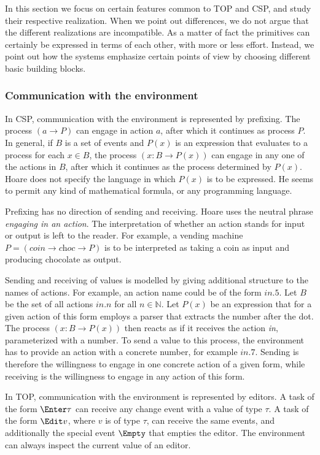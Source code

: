 In this section we focus on certain features common to TOP and CSP, and study their respective realization.
When we point out differences, we do not argue that the different realizations are incompatible.
As a matter of fact the primitives can certainly be expressed in terms of each other, with more or less effort.
Instead, we point out how the systems emphasize certain points of view by choosing different basic building blocks.


\subsubsection{Communication with the environment}

In CSP, communication with the environment is represented by prefixing.
The process $(a \to P)$ can engage in action $a$, after which it continues as process $P$.
In general, if $B$ is a set of events and $P(x)$ is an expression that evaluates to a process for each $x \in B$, the process $(x:B \to P(x))$ can engage in any one of the actions in $B$, after which it continues as the process determined by $P(x)$.
Hoare does not specify the language in which $P(x)$ is to be expressed.
He seems to permit any kind of mathematical formula, or any programming language.

Prefixing has no direction of sending and receiving.
Hoare uses the neutral phrase \emph{engaging in an action}.
The interpretation of whether an action stands for input or output is left to the reader.
For example, a vending machine $P = (\textit{coin} \to \textit{choc} \to P)$ is to be interpreted as taking a coin as input and producing chocolate as output.

Sending and receiving of values is modelled by giving additional structure to the names of actions.
For example, an action name could be of the form $\textit{in}.5$.
Let $B$ be the set of all actions $\textit{in}.n$ for all $n \in \mathbb{N}$.
Let $P(x)$ be an expression that for a given action of this form employs a parser that extracts the number after the dot.
The process $(x:B \to P(x))$ then reacts as if it receives the action \textit{in}, parameterized with a number.
To send a value to this process, the environment has to provide an action with a concrete number, for example $\textit{in}.7$.
Sending is therefore the willingness to engage in one concrete action of a given form, while receiving is the willingness to engage in any action of this form.

In TOP, communication with the environment is represented by editors.
A task of the form $\Enter \tau$ can receive any change event with a value of type $\tau$.
A task of the form $\Edit v$, where $v$ is of type $\tau$, can receive the same
events, and additionally the special event $\Empty$ that empties the editor.
The environment can always inspect the current value of an editor.


